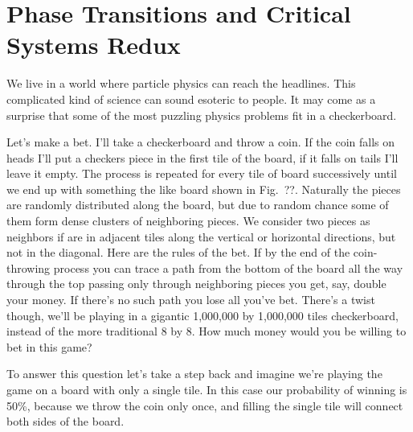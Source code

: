 \chapter{Phase Transitions and Critical Systems Redux}
\label{ch:criticality}


We live in a world where particle physics can reach the headlines. This
complicated kind of science can sound esoteric to people. It may come as a
surprise that some of the most puzzling physics problems fit in a checkerboard.

Let's make a bet. I'll take a checkerboard and throw a coin. If the coin falls
on heads I'll put a checkers piece in the first tile of the board, if it falls
on tails I'll leave it empty. The process is repeated for every tile of board
successively until we end up with something the like board shown in Fig.~??.
Naturally the pieces are randomly distributed along the board, but due to
random chance some of them form dense clusters of neighboring pieces. We
consider two pieces as neighbors if are in adjacent tiles along the vertical or
horizontal directions, but not in the diagonal. Here are the rules of the bet.
If by the end of the coin-throwing process you can trace a path from the bottom
of the board all the way through the top passing only through neighboring
pieces you get, say, double your money. If there's no such path you lose all
you've bet. There's a twist though, we'll be playing in a gigantic 1,000,000 by
1,000,000 tiles checkerboard, instead of the more traditional 8 by 8. How much
money would you be willing to bet in this game?

To answer this question let's take a step back and imagine we're playing the
game on a board with only a single tile. In this case our probability of
winning is 50\%, because we throw the coin only once, and filling the single
tile will connect both sides of the board.

